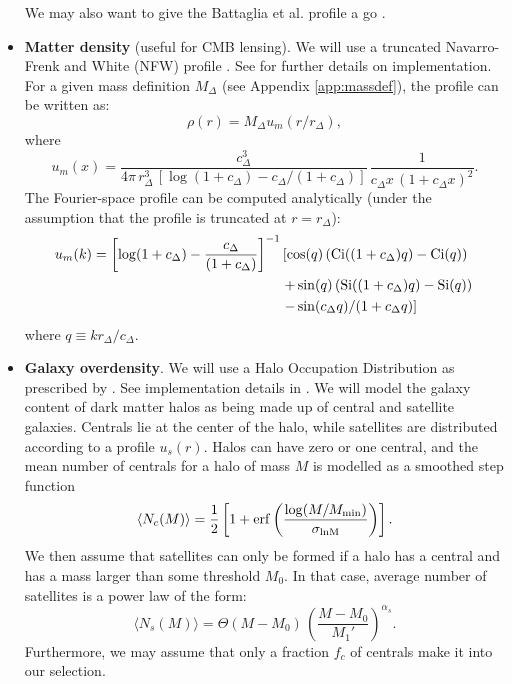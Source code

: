 \documentclass{article}
\begin{document}
\begin{itemize}
              We may also want to give the Battaglia et al. profile a go \cite{2012ApJ...758...75B}.
        \item {\bf Matter density} (useful for CMB lensing). We will use a truncated Navarro-Frenk and White (NFW) profile \cite{1997ApJ...490..493N}. See \cite{2017MNRAS.470.2100K} for further details on implementation.
              For a given mass definition $M_\Delta$ (see Appendix \ref{app:massdef}), the profile can be written as:
              \begin{equation}
                \rho(r)=M_\Delta u_m(r/r_\Delta),
              \end{equation}
              where
              \begin{equation}
                u_m(x)=\frac{c_\Delta^3}{4\pi\,r_\Delta^3\,[\log(1+c_\Delta)-c_\Delta/(1+c_\Delta)]}\,\frac{1}{c_\Delta x\,(1+c_\Delta x)^2}.
              \end{equation}
              The Fourier-space profile can be computed analytically (under the assumption that the profile is truncated at $r=r_\Delta$):
              \begin{align}\nonumber
                u_m(k)=\left[\log(1+c_\Delta)-\frac{c_\Delta}{(1+c_\Delta)}\right]^{-1}&\left[\cos(q)\left({\rm Ci}((1+c_\Delta)q)-{\rm Ci}(q)\right)\right.\\\nonumber
                      &\left.+\sin(q)\left({\rm Si}((1+c_\Delta)q)-{\rm Si}(q)\right)\right.\\&\left.-\sin(c_\Delta q)/(1+c_\Delta q)\right]
              \end{align}
              where $q\equiv kr_\Delta/c_\Delta$.
        \item {\bf Galaxy overdensity}. We will use a Halo Occupation Distribution as prescribed by \cite{2005ApJ...633..791Z,2011ApJ...736...59Z}. See implementation details in \cite{2017MNRAS.470.2100K}.
              We will model the galaxy content of dark matter halos as being made up of central and satellite galaxies. Centrals lie at the center of the halo, while satellites are distributed according to a profile $u_s(r)$. Halos can have zero or one central, and the mean number of centrals for a halo of mass $M$ is modelled as a smoothed step function
              \begin{equation}
                \langle N_c(M)\rangle=\frac{1}{2}\left[1+{\rm erf}\left(\frac{\log(M/M_{\rm min})}{\sigma_{\rm lnM}}\right)\right].
              \end{equation}
              We then assume that satellites can only be formed if a halo has a central and has a mass larger than some threshold $M_0$. In that case, average number of satellites is a power law of the form:
              \begin{equation}
                \langle N_s(M)\rangle=\Theta(M-M_0)\,\left(\frac{M-M_0}{M_1'}\right)^{\alpha_s}.
              \end{equation}
              Furthermore, we may assume that only a fraction $f_c$ of centrals make it into our selection.


\end{itemize}
\end{document}
